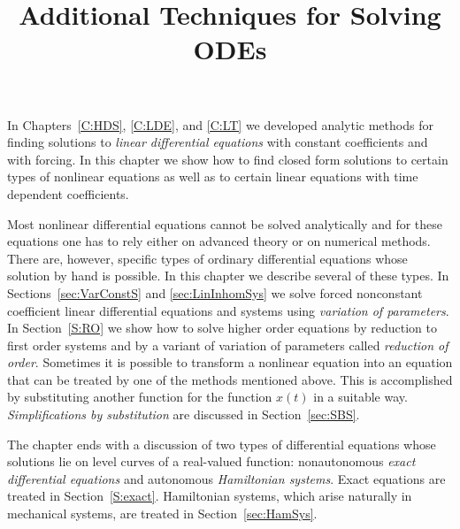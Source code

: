 \documentclass{ximera}
\title{Additional Techniques for Solving ODEs}
\begin{document}
\begin{abstract}
\end{abstract}
\maketitle


\label{chap:SingleOdes}

In Chapters~\ref{C:HDS}, \ref{C:LDE}, and \ref{C:LT} we developed analytic 
methods for finding solutions to {\em linear differential equations\/} with 
constant coefficients and with forcing.  In this chapter we show how to find 
closed form solutions to certain types of nonlinear equations as well as to 
certain linear equations with time dependent coefficients.

Most nonlinear differential equations cannot be solved analytically and   
for these equations one has to rely either on advanced theory or on 
numerical methods.  There are, however, specific types of ordinary differential 
equations whose solution by hand is possible.  In this chapter we describe 
several of these types.  In Sections~\ref{sec:VarConstS} and 
\ref{sec:LinInhomSys} we solve forced nonconstant coefficient linear 
differential equations and systems using {\em variation of parameters}.  In 
Section~\ref{S:RO} we show how to solve higher order equations by reduction 
to first order systems and by a variant of variation of parameters called 
{\em reduction of order\/}.  
Sometimes it is possible to transform a nonlinear equation into an equation 
that can be treated by one of the methods mentioned above.  This is 
accomplished by substituting another function for the function $x(t)$ in a suitable way.  {\em Simplifications by substitution\/} are discussed in 
Section~\ref{sec:SBS}.  

The chapter ends with a discussion of two types of 
differential equations whose solutions lie on level curves of a real-valued 
function: nonautonomous {\em exact differential equations\/} and autonomous 
{\em Hamiltonian systems}.  Exact equations are treated in 
Section~\ref{S:exact}.   Hamiltonian systems, which arise naturally in 
mechanical systems, are treated in Section~\ref{sec:HamSys}.  
\end{document}

